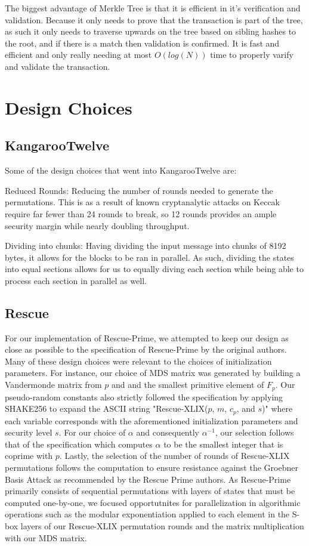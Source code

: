 \documentclass[conference]{IEEEtran}
\begin{document}
The biggest advantage of Merkle Tree is that it is efficient in it's verification and validation. Because it only needs to prove that the transaction is part of the tree, as such it only needs to traverse upwards on the tree based on sibling hashes to the root, and if there is a match then validation is confirmed. It is fast and efficient and only really needing at most $O(log(N))$ time to properly varify and validate the transaction.

\section{Design Choices}

\subsection{KangarooTwelve}
Some of the design choices that went into KangarooTwelve are:

Reduced Rounds: Reducing the number of rounds needed to generate the permutations. This is as a result of known cryptanalytic attacks on Keccak require far fewer than 24 rounds to break, so 12 rounds provides an ample security margin while nearly doubling throughput.

Dividing into chunks: Having dividing the input message into chunks of 8192 bytes, it allows for the blocks to be ran in parallel. As such, dividing the states into equal sections allows for us to equally diving each section while being able to process each section in parallel as well.

\subsection{Rescue}
For our implementation of Rescue-Prime, we attempted to keep our design as close as possible to the specification of Rescue-Prime by the original authors. Many of these design choices were relevant to the choices of initialization parameters. For instance, our choice of MDS matrix was generated by building a Vandermonde matrix from $p$ and and the smallest primitive element of $F_p$. Our pseudo-random constants also strictly followed the specification by applying SHAKE256 to expand the ASCII string "Rescue-XLIX($p$, $m$, $c_p$, and $s$)" where each variable corresponds with the aforementioned initialization parameters and security level $s$. For our choice of $\alpha$ and consequently $\alpha^{-1}$, our selection follows that of the specification which computes $\alpha$ to be the smallest integer that is coprime with $p$. Lastly, the selection of the number of rounds of Rescue-XLIX permutations follows the computation to ensure resistance against the Groebner Basis Attack as recommended by the Rescue Prime authors.
As Rescue-Prime primarily consists of sequential permutations with layers of states that must be computed one-by-one, we focused opportutnites for parallelization in algorithmic operations such as the modular exponentiation applied to each element in the S-box layers of our Rescue-XLIX permutation rounds and the matrix multiplication with our MDS matrix.
\end{document}
